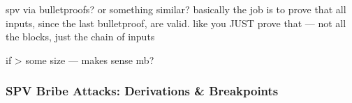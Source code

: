 \begin{draftonly}

spv via bulletproofs?
or something similar?
basically the job is to prove that all inputs, since the last bulletproof, are valid.
like you JUST prove that --- not all the blocks, just the chain of inputs

if > some size --- makes sense mb?



\end{draftonly}



%
%
%
%

\subsubsection{SPV Bribe Attacks: Derivations \& Breakpoints}


